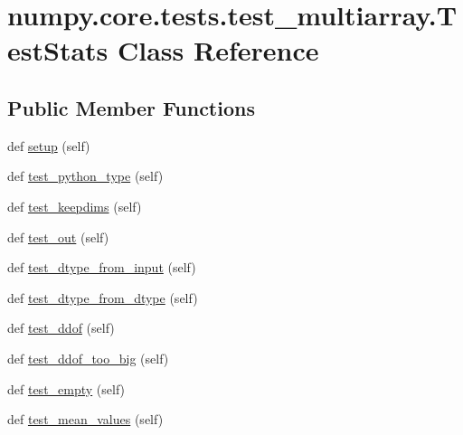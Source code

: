 \hypertarget{classnumpy_1_1core_1_1tests_1_1test__multiarray_1_1TestStats}{}\section{numpy.\+core.\+tests.\+test\+\_\+multiarray.\+Test\+Stats Class Reference}
\label{classnumpy_1_1core_1_1tests_1_1test__multiarray_1_1TestStats}
\subsection*{Public Member Functions}
\begin{DoxyCompactItemize}
\item 
def \hyperlink{classnumpy_1_1core_1_1tests_1_1test__multiarray_1_1TestStats_ab069d515eedd6a65b237f09348131e82}{setup} (self)
\item 
def \hyperlink{classnumpy_1_1core_1_1tests_1_1test__multiarray_1_1TestStats_a38c3625e0fbb8a0729a80249d067ee52}{test\+\_\+python\+\_\+type} (self)
\item 
def \hyperlink{classnumpy_1_1core_1_1tests_1_1test__multiarray_1_1TestStats_a3a77f17a9fb45e0503cc11e9255ee572}{test\+\_\+keepdims} (self)
\item 
def \hyperlink{classnumpy_1_1core_1_1tests_1_1test__multiarray_1_1TestStats_ad714aacf1a3571978bdaf38b9e6447e1}{test\+\_\+out} (self)
\item 
def \hyperlink{classnumpy_1_1core_1_1tests_1_1test__multiarray_1_1TestStats_ae34a63c997706cdce9b08d2b60c241d7}{test\+\_\+dtype\+\_\+from\+\_\+input} (self)
\item 
def \hyperlink{classnumpy_1_1core_1_1tests_1_1test__multiarray_1_1TestStats_a2930e3bbdfbf57e52caa060e2453249d}{test\+\_\+dtype\+\_\+from\+\_\+dtype} (self)
\item 
def \hyperlink{classnumpy_1_1core_1_1tests_1_1test__multiarray_1_1TestStats_a7fdc19d5ae0754ec2ac0c92ae6f8d4ea}{test\+\_\+ddof} (self)
\item 
def \hyperlink{classnumpy_1_1core_1_1tests_1_1test__multiarray_1_1TestStats_a8dd175b1eaf624bf53fd44afc3a22cbb}{test\+\_\+ddof\+\_\+too\+\_\+big} (self)
\item 
def \hyperlink{classnumpy_1_1core_1_1tests_1_1test__multiarray_1_1TestStats_afdc13b975a2a452ee1271acf9ed49ca3}{test\+\_\+empty} (self)
\item 
def \hyperlink{classnumpy_1_1core_1_1tests_1_1test__multiarray_1_1TestStats_aab6adaacca3b2c8d4a764087a85e7cbd}{test\+\_\+mean\+\_\+values} (self)

\end{DoxyCompactItemize}
